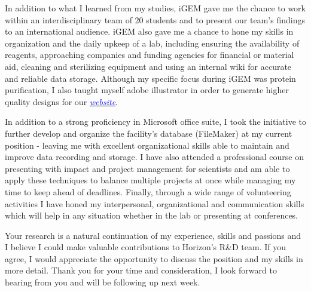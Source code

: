 \documentclass[11pt,a4paper,sans]{moderncv}
\begin{document}
\begin{spacing}{1.1}
In addition to what I learned from my studies, iGEM gave me the chance to work within an interdisciplinary team of 20 students and to present our team's findings to an international audience. iGEM also gave me a chance to hone my skills in organization and the daily upkeep of a lab, including ensuring the availability of reagents, approaching companies and funding agencies for financial or material aid, cleaning and sterilizing equipment and using an internal wiki for accurate and reliable data storage. Although my specific focus during iGEM was protein purification, I also taught myself adobe illustrator in order to generate higher quality designs for our {\href{http://2015.igem.org/Team:Freiburg}{\textcolor{blue}{\textit{website}}}}.\par 

In addition to a strong proficiency in Microsoft office suite, I took the initiative to further develop and organize the facility's database (FileMaker) at my current position - leaving me with excellent organizational skills able to maintain and improve data recording and storage. I have also attended a professional course on presenting with impact and project management for scientists and am able to apply these techniques to balance multiple projects at once while managing my time to keep ahead of deadlines. Finally, through a wide range of volunteering activities I have honed my interpersonal, organizational and communication skills which will help in any situation whether in the lab or presenting at conferences.\par%

Your research is a natural continuation of my experience, skills and passions and I believe I could make valuable contributions to Horizon's R\&D team. If you agree, I would appreciate the opportunity to discuss the position and my skills in more detail. Thank you for your time and consideration, I look forward to hearing from you and will be following up next week.

\end{spacing}
\makeletterclosing
\end{document}
